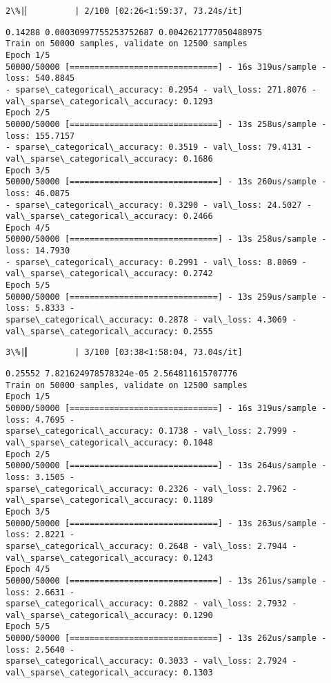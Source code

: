 \documentclass[11pt]{article}
\begin{document}
    \begin{Verbatim}[commandchars=\\\{\}]
  2\%|▏         | 2/100 [02:26<1:59:37, 73.24s/it]
    \end{Verbatim}

    \begin{Verbatim}[commandchars=\\\{\}]
0.14288 0.00030997755253752687 0.0042621777050488975
Train on 50000 samples, validate on 12500 samples
Epoch 1/5
50000/50000 [==============================] - 16s 319us/sample - loss: 540.8845
- sparse\_categorical\_accuracy: 0.2954 - val\_loss: 271.8076 -
val\_sparse\_categorical\_accuracy: 0.1293
Epoch 2/5
50000/50000 [==============================] - 13s 258us/sample - loss: 155.7157
- sparse\_categorical\_accuracy: 0.3519 - val\_loss: 79.4131 -
val\_sparse\_categorical\_accuracy: 0.1686
Epoch 3/5
50000/50000 [==============================] - 13s 260us/sample - loss: 46.0875
- sparse\_categorical\_accuracy: 0.3290 - val\_loss: 24.5027 -
val\_sparse\_categorical\_accuracy: 0.2466
Epoch 4/5
50000/50000 [==============================] - 13s 258us/sample - loss: 14.7930
- sparse\_categorical\_accuracy: 0.2991 - val\_loss: 8.8069 -
val\_sparse\_categorical\_accuracy: 0.2742
Epoch 5/5
50000/50000 [==============================] - 13s 259us/sample - loss: 5.8333 -
sparse\_categorical\_accuracy: 0.2878 - val\_loss: 4.3069 -
val\_sparse\_categorical\_accuracy: 0.2555
    \end{Verbatim}

    \begin{Verbatim}[commandchars=\\\{\}]
  3\%|▎         | 3/100 [03:38<1:58:04, 73.04s/it]
    \end{Verbatim}

    \begin{Verbatim}[commandchars=\\\{\}]
0.25552 7.821624978578324e-05 2.564811615707776
Train on 50000 samples, validate on 12500 samples
Epoch 1/5
50000/50000 [==============================] - 16s 319us/sample - loss: 4.7695 -
sparse\_categorical\_accuracy: 0.1738 - val\_loss: 2.7999 -
val\_sparse\_categorical\_accuracy: 0.1048
Epoch 2/5
50000/50000 [==============================] - 13s 264us/sample - loss: 3.1505 -
sparse\_categorical\_accuracy: 0.2326 - val\_loss: 2.7962 -
val\_sparse\_categorical\_accuracy: 0.1189
Epoch 3/5
50000/50000 [==============================] - 13s 263us/sample - loss: 2.8221 -
sparse\_categorical\_accuracy: 0.2648 - val\_loss: 2.7944 -
val\_sparse\_categorical\_accuracy: 0.1243
Epoch 4/5
50000/50000 [==============================] - 13s 261us/sample - loss: 2.6631 -
sparse\_categorical\_accuracy: 0.2882 - val\_loss: 2.7932 -
val\_sparse\_categorical\_accuracy: 0.1290
Epoch 5/5
50000/50000 [==============================] - 13s 262us/sample - loss: 2.5640 -
sparse\_categorical\_accuracy: 0.3033 - val\_loss: 2.7924 -
val\_sparse\_categorical\_accuracy: 0.1303
    \end{Verbatim}
\end{document}
